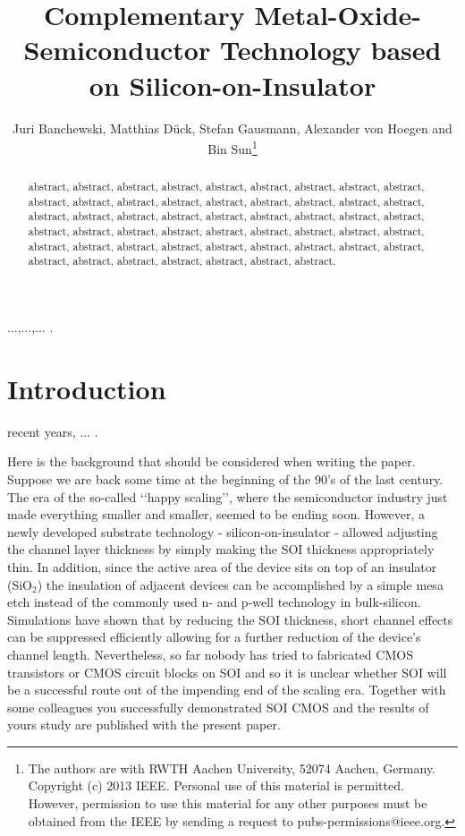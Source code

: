 \documentclass[journal]{IEEEtran} %
\begin{document}
\title{Complementary Metal-Oxide-Semiconductor Technology based on Silicon-on-Insulator}
%
\author{Juri Banchewski, Matthias D\"uck, Stefan Gausmann, Alexander von Hoegen and Bin Sun\thanks{The authors are with RWTH Aachen University, 52074 Aachen, Germany. Copyright (c) 2013 IEEE. Personal use of this material is permitted.
However, permission to use this material for any other purposes must be
obtained from the IEEE by sending a request to pubs-permissions@ieee.org.}}

\maketitle
%
\begin{abstract}
  abstract, abstract, abstract, abstract, abstract, abstract, abstract, abstract, abstract, abstract, abstract, abstract, abstract, abstract, abstract, abstract, abstract, abstract, abstract, abstract, abstract, abstract, abstract, abstract, abstract, abstract, abstract, abstract, abstract, abstract, abstract, abstract, abstract, abstract, abstract, abstract, abstract, abstract, abstract, abstract, abstract, abstract, abstract, abstract, abstract, abstract, abstract, abstract, abstract, abstract, abstract, abstract.
\end{abstract}

\begin{IEEEkeywords}
...,...,... .
\end{IEEEkeywords}
%
\section{Introduction}\label{intro}
 recent years, ... \cite{test}.

Here is the background that should be considered when writing the paper. Suppose we are back some time at the beginning of the 90's of the last century. The era of the so-called \lq\lq happy scaling\rq\rq , where the semiconductor industry just made everything smaller and smaller, seemed to be ending soon. However, a newly developed substrate technology - silicon-on-insulator - allowed adjusting the channel layer thickness by simply making the SOI thickness appropriately thin. In addition, since the active area of the device sits on top of an insulator (SiO$_2$) the insulation of adjacent devices can be accomplished by a simple mesa etch instead of the commonly used n- and p-well technology in bulk-silicon. Simulations have shown that by reducing the SOI thickness, short channel effects can be suppressed efficiently allowing for a further reduction of the device's channel length. Nevertheless, so far nobody has tried to fabricated CMOS transistors or CMOS circuit blocks on SOI and so it is unclear whether SOI will be a successful route out of the impending end of the scaling era. Together with some colleagues you successfully demonstrated SOI CMOS and the results of yours study are published with the present paper. 
\end{document}
